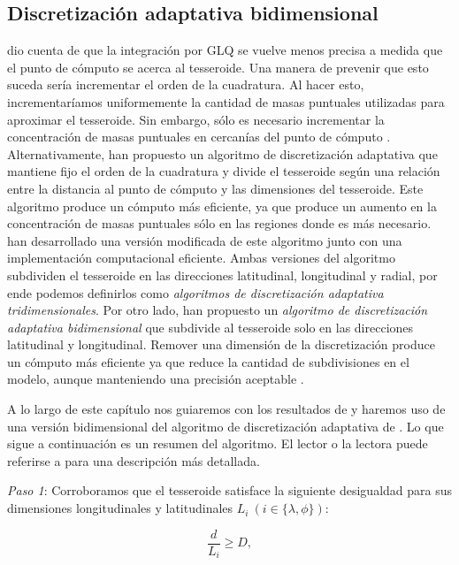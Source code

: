 \subsection{Discretización adaptativa bidimensional}

\citet{ku1977} dio cuenta de que la integración por \ac{GLQ} se vuelve menos
precisa a medida que el punto de cómputo se acerca al tesseroide.
Una manera de prevenir que esto suceda sería incrementar el orden de la
cuadratura.
Al hacer esto, incrementaríamos uniformemente la cantidad de masas puntuales
utilizadas para aproximar el tesseroide.
Sin embargo, sólo es necesario incrementar la concentración de masas puntuales
en cercanías del punto de cómputo \citep{uieda2016}.
Alternativamente,  \citet{li2011} han propuesto un algoritmo de discretización
adaptativa que mantiene fijo el orden de la cuadratura y divide el tesseroide
según una relación entre la distancia al punto de cómputo y las dimensiones
del tesseroide.
Este algoritmo produce un cómputo más eficiente, ya que produce un aumento en
la concentración de masas puntuales sólo en las regiones donde es más
necesario. \citet{uieda2016} han desarrollado una versión modificada de este
algoritmo junto con una implementación computacional eficiente.
Ambas versiones del algoritmo subdividen el tesseroide en las direcciones
latitudinal, longitudinal y radial, por ende podemos definirlos como
\emph{algoritmos de discretización adaptativa tridimensionales}.
Por otro lado, \citet{lin2019} han propuesto un \emph{algoritmo de
discretización adaptativa bidimensional} que subdivide al tesseroide solo en
las direcciones latitudinal y longitudinal.
Remover una dimensión de la discretización produce un cómputo más eficiente ya
que reduce la cantidad de subdivisiones en el modelo, aunque manteniendo una
precisión aceptable \citep{lin2019}.

A lo largo de este capítulo nos guiaremos con los resultados de \citet{lin2019}
y haremos uso de una versión bidimensional del algoritmo de discretización
adaptativa de \citet{uieda2016}.
Lo que sigue a continuación es un resumen del algoritmo. El lector o la lectora
puede referirse a \citet{uieda2016} para una descripción más detallada.

\textit{Paso 1}: Corroboramos que el tesseroide satisface la siguiente
desigualdad para sus dimensiones longitudinales y latitudinales
$L_i\ (i \in \{\lambda, \phi\})$:

\begin{equation}
    \frac{d}{L_i} \geq D,
    \label{eq:condition}
\end{equation}

